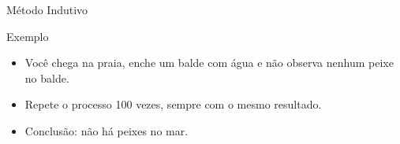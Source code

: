 \documentclass{beamer}
\begin{document}
\begin{frame}{Método Indutivo}
  \begin{exampleblock}{Exemplo}
    \begin{itemize}
      \footnotesize
    \item Você chega na praia, enche um balde com água e não observa
      nenhum peixe no balde.
      \bigskip
    \item Repete o processo 100 vezes, sempre com o mesmo resultado.
      \bigskip
    \item Conclusão: não há peixes no mar.
    \end{itemize}
  \end{exampleblock}
\end{frame}



\end{document}
